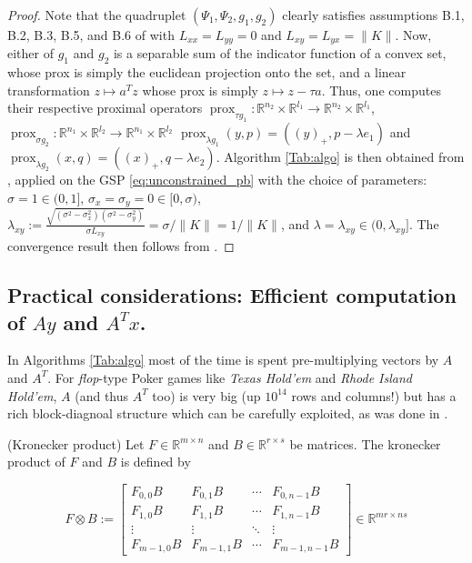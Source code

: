 \documentclass[envcountsame]{llncs} %
\DeclareMathOperator{\prox}{prox}
\begin{document}
\begin{proof}
Note that the quadruplet $(\Psi_1, \Psi_2, g_1, g_2)$ clearly satisfies
assumptions B.1, B.2, B.3, B.5, and B.6 of \cite{he2013accelerating}
with $L_{xx} = L_{yy} = 0$ and $L_{xy} = L_{yx} = \|K\|$. Now,
either of $g_1$ and $g_2$ is a separable sum of
the indicator function of a convex set, whose prox is simply the
euclidean projection onto the set,  and a linear transformation $z
\mapsto a^Tz$ whose prox is simply $z \mapsto z - \tau a$. Thus,  one
computes their respective proximal operators $\prox_{\tau g_1} :
\mathbb{R}^{n_2} \times \mathbb{R}^{l_1} \rightarrow \mathbb{R}^{n_2}
\times \mathbb{R}^{l_1}$, $\prox_{\sigma g_2}: \mathbb{R}^{n_1} \times
\mathbb{R}^{l_2} \rightarrow \mathbb{R}^{n_1} \times \mathbb{R}^{l_2}$
$\prox_{\lambda g_1}(y, p) = ((y)_+, p - \lambda e_1)$ and $\prox_{\lambda
  g_2}(x, q) = ((x)_+, q - \lambda e_2)$. Algorithm \ref{Tab:algo} is
then obtained from \cite[Algorithm
  T-BD]{he2013accelerating}, applied on the GSP \eqref{eq:unconstrained_pb}
 with the choice of parameters: $\sigma = 1 \in (0, 1]$, $\sigma_x =
         \sigma_y = 0 \in [0, \sigma)$,
 $\lambda_{xy} := \frac{\sqrt{(\sigma^2 - \sigma_x^2)(\sigma^2 -
               \sigma_y^2)}}{\sigma L_{xy}} = \sigma / \|K\| =
           1/\|K\|$, and $\lambda = \lambda_{xy} \in (0,
           \lambda_{xy}]$. The convergence result then follows from
         \cite[Theorem 4.2]{he2013accelerating}.
\end{proof}
\subsection{Practical considerations: Efficient computation of $Ay$ and $A^Tx$.}
In Algorithms \ref{Tab:algo} most of the time is spent
pre-multiplying vectors by $A$ and $A^T$. For \textit{flop}-type Poker
games like \textit{Texas Hold'em} and  \textit{Rhode Island Hold'em},
$A$ (and thus $A^T$ too)  is very big (up $10^{14}$ rows and columns!)
but has a rich block-diagnoal structure which can be carefully
exploited, as was done in \cite{hoda2010smoothing}.


\begin{definition}(Kronecker product)
Let $F \in \mathbb{R}^{m \times n}$ and $B \in \mathbb{R}^{r \times
  s}$ be matrices. The kronecker product of $F$ and $B$ is defined by

\begin{equation}
F \otimes B:=\left[
\begin{array}{cccc}
F_{0,0}B & F_{0,1}B & \cdots & F_{0,n-1}B \\
F_{1,0}B & F_{1,1}B & \cdots & F_{1,n-1}B \\
\vdots & \vdots & \ddots & \vdots\\
F_{m-1,0}B & F_{m-1,1}B & \cdots & F_{m-1,n-1}B 
\end{array}\right] \in \mathbb{R}^{mr \times ns}
\end{equation}
\end{definition}
\end{document}
